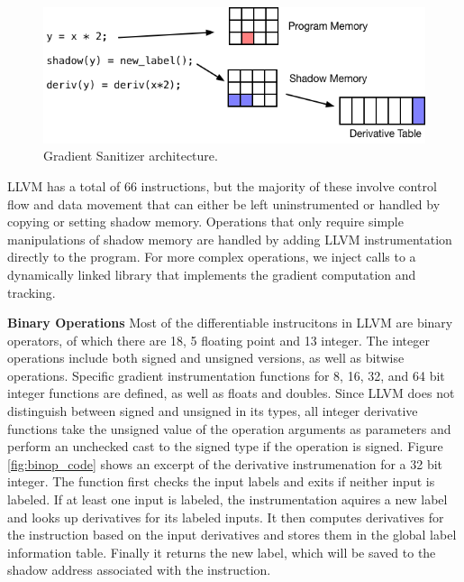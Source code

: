 \begin{figure}
    \includegraphics[width=\columnwidth]{figs/grsan_layout}
  \vspace{-20pt}
  \caption{\label{fig:grsan_diagram}Gradient Sanitizer architecture.}
  \vspace{-10pt}
\end{figure}

LLVM has a total of 66 instructions, but the majority of these involve control flow and data movement that can either be left uninstrumented or handled by copying or setting shadow memory. Operations that only require simple manipulations of shadow memory are handled by adding LLVM instrumentation directly to the program. For more complex operations, we inject calls to a dynamically linked library that implements the gradient computation and tracking.

\noindent \textbf{Binary Operations} Most of the differentiable instrucitons in LLVM are binary operators, of which there are 18, 5 floating point and 13 integer. The integer operations include both signed and unsigned versions, as well as bitwise operations. Specific gradient instrumentation functions for 8, 16, 32, and 64 bit integer functions are defined, as well as floats and doubles. Since LLVM does not distinguish between signed and unsigned in its types, all integer derivative functions take the unsigned value of the operation arguments as parameters and perform an unchecked cast to the signed type if the operation is signed. Figure \ref{fig:binop_code} shows an excerpt of the derivative instrumenation for a 32 bit integer. The function first checks the input labels and exits if neither input is labeled. If at least one input is labeled, the instrumentation aquires a new label and looks up derivatives for its labeled inputs. It then computes derivatives for the instruction based on the input derivatives and stores them in the global label information table. Finally it returns the new label, which will be saved to the shadow address associated with the instruction.

